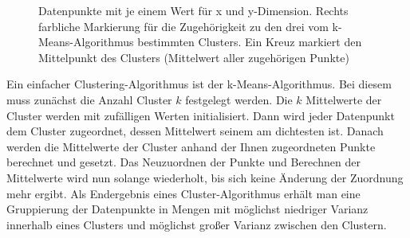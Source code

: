 \documentclass[
	12pt,
	a4paper,
	BCOR10mm,
	DIV14,
	listof=totoc,
	bibliography=totoc,
	headsepline
]{scrreprt}
\begin{document}
\begin{figure} [h]
	\hfill
	\caption{Datenpunkte mit je einem Wert für x und y-Dimension. Rechts farbliche Markierung für die Zugehörigkeit zu den drei vom k-Means-Algorithmus bestimmten Clusters. Ein Kreuz markiert den Mittelpunkt des Clusters (Mittelwert aller zugehörigen Punkte)}
	\label{fig:clustering_beispiel}
\end{figure} 

Ein einfacher Clustering-Algorithmus ist der k-Means-Algorithmus. Bei diesem muss zunächst die Anzahl Cluster $k$ festgelegt werden. Die $k$ Mittelwerte der Cluster werden mit zufälligen Werten initialisiert. Dann wird jeder Datenpunkt dem Cluster zugeordnet, dessen Mittelwert seinem am dichtesten ist. Danach werden die Mittelwerte der Cluster anhand der Ihnen zugeordneten Punkte berechnet und gesetzt. Das Neuzuordnen der Punkte und Berechnen der Mittelwerte wird nun solange wiederholt, bis sich keine Änderung der Zuordnung mehr ergibt. Als Endergebnis eines Cluster-Algorithmus erhält man eine Gruppierung der Datenpunkte in Mengen mit möglichst niedriger Varianz innerhalb eines Clusters und möglichst großer Varianz zwischen den Clustern.
\end{document}
